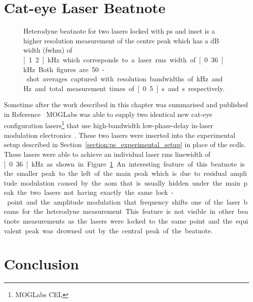 \section{Cat-eye Laser Beatnote}

\begin{figure}
\center

\caption[Heterodyne beatnote for two cat-eye lasers locked with high-bandwidth polarisation spectroscopy.]{Heterodyne beatnote for two lasers locked with \gls{ps} and inset is a higher resolution measurement of the centre peak which has a \unit[-3]{dB} width (\gls{fwhm}) of \unit[1.2]{kHz} which corresponds to a laser \gls{rms} width of \unit[0.36]{kHz}.
Both figures are 50-shot averages captured with resolution bandwidths of \unit[30]{kHz} and \unit[100]{Hz} and total measurement times of \unit[0.5]{s} and \unit[2]{s} respectively.}
\label{figure:cateye_beatnote}
\end{figure}

Sometime after the work described in this chapter was summarised and published in Reference~\cite{torrance_sub-kilohertz_2016} MOGLabs was able to supply two identical new cat-eye configuration lasers\footnote{MOGLabs CEL} that use high-bandwidth low-phase-delay in-laser modulation electronics~\cite{thompson_narrow_2012}.
These two lasers were inserted into the experimental setup described in Section~\ref{section:ps_experimental_setup} in place of the \glspl{ecdl}.
These lasers were able to achieve an individual laser \gls{rms} linewidth of \unit[0.36]{kHz} as shown in Figure~\ref{figure:cateye_beatnote}.
An interesting feature of this beatnote is the smaller peak to the left of the main peak which is due to residual amplitude modulation caused by the \gls{aom} that is usually hidden under the main peak.
 the two lasers not having exactly the same lock-point and the amplitude modulation  that frequency shifts one of the laser beams for the heterodyne measurement.
This feature is not visible in other beatnote measurements as the lasers were locked to the same point and the equivalent peak was drowned out by the central peak of the beatnote.

\section{Conclusion}

